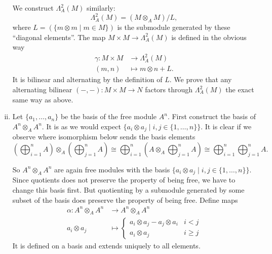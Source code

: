 \begin{exercise}{4}
\begin{enumerate}[i)]
            We construct $\Lambda^2_A(M)$ similarly:
            \begin{equation*}
                \Lambda^2_A(M) = (M \otimes_A M) / L,
            \end{equation*}
            where $L = (\{ m \otimes m \mid m \in M\})$ is the submodule
            generated by these ``diagonal elements''. The map $M \times M
            \rightarrow \Lambda^2_A(M)$ is defined in the obvious way
            \begin{align*}
                \gamma \colon M \times M &\rightarrow \Lambda^2_A(M) \\
                (m, n) &\mapsto m \otimes n + L.
            \end{align*}
            It is bilinear and alternating by the definition of $L$.
            We prove that any alternating bilinear $(-, -) \colon M \times M
            \rightarrow N$ factors through $\Lambda^2_A(M)$ the exact same way
            as above.

        \item Let $\{a_1, \ldots, a_n\}$ be the basis of the free module $A^n$.
            First construct the basis of $A^n \otimes_A A^n$. It is as we would
            expect $\{ a_i \otimes a_j \mid i, j \in \{1, \ldots, n\}\}$. It is
            clear if we observe where isomorphism below sends the basis
            elements
            \begin{equation*}
                (\bigoplus^n_{i=1} A) \otimes_A (\bigoplus^n_{j=1} A) \cong
                \bigoplus^n_{i=1} (A \otimes_A \bigoplus^n_{j=1} A) \cong
                \bigoplus^n_{i=1} \bigoplus^n_{j=1} A.
            \end{equation*}

            So $A^n \otimes_A A^n$ are again free modules with the basis $\{ a_i
            \otimes a_j \mid i, j \in \{1, \ldots, n\}\}$. Since quotients does
            not preserve the property of being free, we have to change this
            basis first. But quotienting by a submodule generated by some subset
            of the basis does preserve the property of being free. Define maps
            \begin{align*}
                \alpha \colon A^n \otimes_A A^n &\rightarrow A^n \otimes_A A^n
                \\
                a_i \otimes a_j &\mapsto 
                \begin{cases} 
                    a_i \otimes a_j - a_j \otimes a_i & i < j \\
                    a_i \otimes a_j & i \geq j 
                \end{cases}
            \end{align*}
            It is defined on a basis and extends uniquely to all elements.


\end{enumerate}
\end{exercise}
